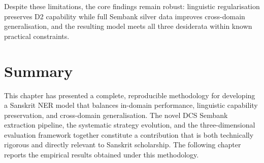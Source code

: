 Despite these limitations, the core findings remain robust: linguistic regularisation preserves D2 capability while full Sembank silver data improves cross-domain generalisation, and the resulting model meets all three desiderata within known practical constraints.

\section{Summary}
\label{sec:summary}

This chapter has presented a complete, reproducible methodology for developing a Sanskrit NER model that balances in-domain performance, linguistic capability preservation, and cross-domain generalisation. The novel DCS Sembank extraction pipeline, the systematic strategy evolution, and the three-dimensional evaluation framework together constitute a contribution that is both technically rigorous and directly relevant to Sanskrit scholarship. The following chapter reports the empirical results obtained under this methodology.

